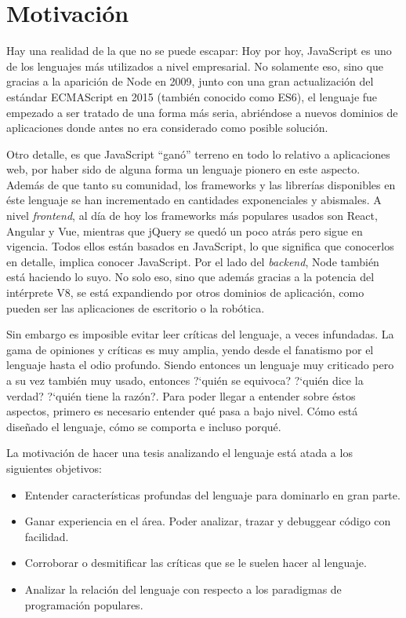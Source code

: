 \section{Motivación}

Hay una realidad de la que no se puede escapar: Hoy por hoy, JavaScript es uno de los lenguajes más utilizados a nivel empresarial. No solamente eso, sino que gracias a la aparición de Node en 2009, junto con una gran actualización del estándar ECMAScript en 2015 (también conocido como ES6), el lenguaje fue empezado a ser tratado de una forma más seria, abriéndose a nuevos dominios de aplicaciones donde antes no era considerado como posible solución.

Otro detalle, es que JavaScript "`ganó"' terreno en todo lo relativo a aplicaciones web, por haber sido de alguna forma un lenguaje pionero en este aspecto. Además de que tanto su comunidad, los frameworks y las librerías disponibles en éste lenguaje se han incrementado en cantidades exponenciales y abismales. A nivel \textit{frontend}, al día de hoy los frameworks más populares usados son React, Angular y Vue, mientras que jQuery se quedó un poco atrás pero sigue en vigencia. Todos ellos están basados en JavaScript, lo que significa que conocerlos en detalle, implica conocer JavaScript. Por el lado del \textit{backend}, Node también está haciendo lo suyo. No solo eso, sino que además gracias a la potencia del intérprete V8, se está expandiendo por otros dominios de aplicación, como pueden ser las aplicaciones de escritorio o la robótica.

Sin embargo es imposible evitar leer críticas del lenguaje, a veces infundadas. La gama de opiniones y críticas es muy amplia, yendo desde el fanatismo por el lenguaje hasta el odio profundo. Siendo entonces un lenguaje muy criticado pero a su vez también muy usado, entonces ?`quién se equivoca? ?`quién dice la verdad? ?`quién tiene la razón?. Para poder llegar a entender sobre éstos aspectos, primero es necesario entender qué pasa a bajo nivel. Cómo está diseñado el lenguaje, cómo se comporta e incluso porqué.

La motivación de hacer una tesis analizando el lenguaje está atada a los siguientes objetivos:

\begin{itemize}
\item Entender características profundas del lenguaje para dominarlo en gran parte.
\item Ganar experiencia en el área. Poder analizar, trazar y debuggear código con facilidad.
\item Corroborar o desmitificar las críticas que se le suelen hacer al lenguaje.
\item Analizar la relación del lenguaje con respecto a los paradigmas de programación populares.
\end{itemize}